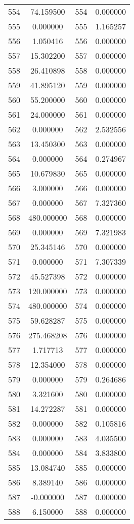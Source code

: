 \documentclass[12pt]{article}
\begin{document}
\begin{longtable}{@{}cccc@{}}
554 & 74.159500 & 554 & 0.000000 \\
555 & 0.000000 & 555 & 1.165257 \\
556 & 1.050416 & 556 & 0.000000 \\
557 & 15.302200 & 557 & 0.000000 \\
558 & 26.410898 & 558 & 0.000000 \\
559 & 41.895120 & 559 & 0.000000 \\
560 & 55.200000 & 560 & 0.000000 \\
561 & 24.000000 & 561 & 0.000000 \\
562 & 0.000000 & 562 & 2.532556 \\
563 & 13.450300 & 563 & 0.000000 \\
564 & 0.000000 & 564 & 0.274967 \\
565 & 10.679830 & 565 & 0.000000 \\
566 & 3.000000 & 566 & 0.000000 \\
567 & 0.000000 & 567 & 7.327360 \\
568 & 480.000000 & 568 & 0.000000 \\
569 & 0.000000 & 569 & 7.321983 \\
570 & 25.345146 & 570 & 0.000000 \\
571 & 0.000000 & 571 & 7.307339 \\
572 & 45.527398 & 572 & 0.000000 \\
573 & 120.000000 & 573 & 0.000000 \\
574 & 480.000000 & 574 & 0.000000 \\
575 & 59.628287 & 575 & 0.000000 \\
576 & 275.468208 & 576 & 0.000000 \\
577 & 1.717713 & 577 & 0.000000 \\
578 & 12.354000 & 578 & 0.000000 \\
579 & 0.000000 & 579 & 0.264686 \\
580 & 3.321600 & 580 & 0.000000 \\
581 & 14.272287 & 581 & 0.000000 \\
582 & 0.000000 & 582 & 0.105816 \\
583 & 0.000000 & 583 & 4.035500 \\
584 & 0.000000 & 584 & 3.833800 \\
585 & 13.084740 & 585 & 0.000000 \\
586 & 8.389140 & 586 & 0.000000 \\
587 & -0.000000 & 587 & 0.000000 \\
588 & 6.150000 & 588 & 0.000000 \\

\end{longtable}
\end{document}
